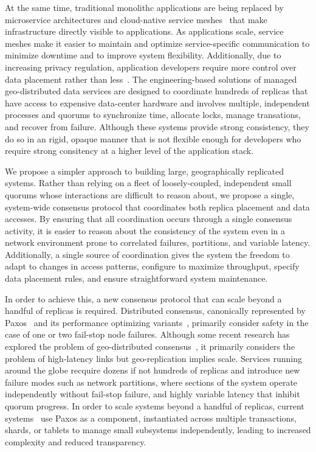 \documentclass[11pt,conference]{IEEEtran}
\begin{document}
At the same time, traditional monolithc applications are being replaced by microservice
architectures and cloud-native service meshes~\cite{envoy} that make
infrastructure directly visible to applications.
As applications scale, service meshes make it easier to maintain and optimize
service-specific communication to minimize downtime and to improve system flexibility.
Additionally, due to increasing privacy regulation, application developers require more
control over data placement rather than less~\cite{gdpr}.
The engineering-based solutions of managed geo-distributed data services are designed to
coordinate hundreds of replicas that have access to expensive data-center hardware and
involves multiple, independent processes and quorums to synchronize time, allocate locks,
manage transations, and recover from failure.
Although these systems provide strong consistency, they do so in an rigid, opaque manner
that is not flexible enough for developers who require strong consitency at a higher
level of the application stack.

We propose a simpler approach to building large, geographically replicated systems.
Rather than relying on a fleet of loosely-coupled, independent small quorums whose
interactions are difficult to reason about, we propose a single, system-wide consensus
protocol that coordinates both replica placement and data accesses.
By ensuring that all coordination occurs through a single consensus activity,
it is easier to reason about the consistency of the system even in a network environment
prone to correlated failures, partitions, and variable latency.
Additionally, a single source of coordination gives the system the freedom to adapt to
changes in access patterns, configure to maximize throughput, specify data placement
rules, and ensure straightforward system maintenance.

In order to achieve this, a new consensus protocol that can scale beyond a handful of
replicas is required.
Distributed consensus, canonically represented by Paxos~\cite{paxos_simple} and its
performance optimizing
variants~\cite{fast_paxos,multicoordinated_paxos,spaxos,generalized_paxos}, primarily
consider safety in the case of one or two fail-stop node failures.
Although some recent research has explored the problem of geo-distributed
consensus~\cite{mencius,epaxos}, it primarily considers the problem of high-latency
links but geo-replication implies scale.
Services running around the globe recquire dozens if not hundreds of replicas and
introduce new failure modes such as network partitions, where sections of the system
operate independently without fail-stop failure, and highly variable latency that
inhibit quorum progress.
In order to scale systems beyond a handful of replicas, current
systems~\cite{spanner,scatter,mdcc,calvinfs} use Paxos as a component, instantiated
across multiple transactions, shards, or tablets to manage small subsystems
independently, leading to increased complexity and reduced transparency.
\end{document}
